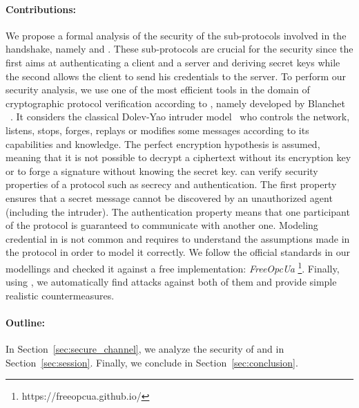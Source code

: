 \paragraph{Contributions:}

We propose a formal analysis of the security of the sub-protocols
involved in the \opcua handshake, namely \opcua{}
\securechan and \opcua{} \session. 
These sub-protocols are crucial for the security since the first aims
at authenticating a client and a server and deriving secret keys while
the second allows the client to send his credentials to the server.
To perform our security analysis, we use one of the most efficient
tools in the domain of cryptographic protocol verification according
to \cite{LP15}, namely \proverif developed by
Blanchet \etal~\cite{Bla01}.  It considers the classical Dolev-Yao
intruder model~\cite{DY81} who controls the network, listens, stops,
forges, replays or modifies some messages according to its
capabilities and knowledge.  The perfect encryption hypothesis is
assumed, meaning that it is not possible to decrypt a ciphertext
without its encryption key or to forge a signature without knowing the
secret key.  \proverif{} can verify security properties of a protocol
such as secrecy and authentication.  The first property ensures that a
secret message cannot be discovered by an unauthorized agent
(including the intruder).  The authentication property means that one
participant of the protocol is guaranteed to communicate with another
one.  Modeling credential in \proverif{} is not common and requires to
understand the assumptions made in the protocol in order to model it
correctly.  We follow the official \opcua standards in our modellings
and checked it against a free implementation: {\em FreeOpcUa}
\footnote{https://freeopcua.github.io/}. Finally, using \proverif{}, we automatically find attacks against both of them and provide
simple realistic countermeasures.

\paragraph{Outline:} In Section~\ref{sec:secure_channel}, we analyze the
security of \opcua{} \securechan and \opcua{} \session in
Section~\ref{sec:session}.  Finally, we conclude in
Section~\ref{sec:conclusion}.


